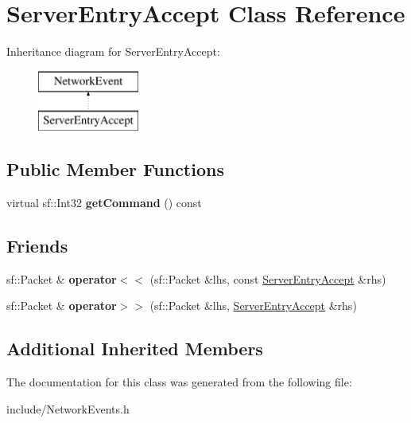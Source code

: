 \hypertarget{class_server_entry_accept}{\section{Server\-Entry\-Accept Class Reference}
\label{class_server_entry_accept}
}
Inheritance diagram for Server\-Entry\-Accept\-:\begin{figure}[H]
\begin{center}
\leavevmode
\includegraphics[height=2.000000cm]{class_server_entry_accept}
\end{center}
\end{figure}
\subsection*{Public Member Functions}
\begin{DoxyCompactItemize}
\item 
\hypertarget{class_server_entry_accept_a0fe534df0130c212dbe8ce0e7d8e874a}{virtual sf\-::\-Int32 {\bfseries get\-Command} () const }\label{class_server_entry_accept_a0fe534df0130c212dbe8ce0e7d8e874a}

\end{DoxyCompactItemize}
\subsection*{Friends}
\begin{DoxyCompactItemize}
\item 
\hypertarget{class_server_entry_accept_aa31f51c0b4c88a51b59bff9d010e6a37}{sf\-::\-Packet \& {\bfseries operator$<$$<$} (sf\-::\-Packet \&lhs, const \hyperlink{class_server_entry_accept}{Server\-Entry\-Accept} \&rhs)}\label{class_server_entry_accept_aa31f51c0b4c88a51b59bff9d010e6a37}

\item 
\hypertarget{class_server_entry_accept_a5e4695e9a3e3dec0f606529a96b8d73a}{sf\-::\-Packet \& {\bfseries operator$>$$>$} (sf\-::\-Packet \&lhs, \hyperlink{class_server_entry_accept}{Server\-Entry\-Accept} \&rhs)}\label{class_server_entry_accept_a5e4695e9a3e3dec0f606529a96b8d73a}

\end{DoxyCompactItemize}
\subsection*{Additional Inherited Members}


The documentation for this class was generated from the following file\-:\begin{DoxyCompactItemize}
\item 
include/Network\-Events.\-h\end{DoxyCompactItemize}
